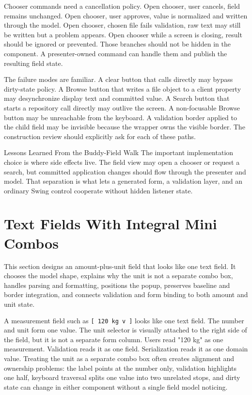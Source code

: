 Chooser commands need a cancellation policy. Open chooser, user cancels, field remains
unchanged. Open chooser, user approves, value is normalized and written through the
model. Open chooser, chosen file fails validation, raw text may still be written but a
problem appears. Open chooser while a screen is closing, result should be ignored or
prevented. Those branches should not be hidden in the component. A presenter-owned
command can handle them and publish the resulting field state.

The failure modes are familiar. A clear button that calls
directly may bypass dirty-state policy. A Browse button that writes a file object to a
client property may desynchronize display text and committed value. A Search button that
starts a repository call directly may outlive the screen. A non-focusable Browse button
may be unreachable from the keyboard. A validation border applied to the child field may
be invisible because the wrapper owns the visible border. The construction review should
explicitly ask for each of these paths.

\begin{principlebox}{Lessons Learned From the Buddy-Field Walk}
The important implementation choice is where side effects live. The field view
may open a chooser or request a search, but committed application changes should
flow through the presenter and model. That separation is what lets a generated
form, a validation layer, and an ordinary Swing control cooperate without hidden
listener state.
\end{principlebox}

\section{Text Fields With Integral Mini Combos}

\begin{roadmapbox}
This section designs an amount-plus-unit field that looks like one text field.
It chooses the model shape, explains why the unit is not a separate combo box,
handles parsing and formatting, positions the popup, preserves baseline and
border integration, and connects validation and form binding to both amount and
unit state.
\end{roadmapbox}

A measurement field such as \texttt{[ 120 kg v ]} looks like one text field. The number
and unit form one value. The unit selector is visually attached to the right side of the
field, but it is not a separate form column. Users read "120 kg" as one measurement.
Validation reads it as one field. Serialization reads it as one domain value. Treating
the unit as a separate combo box often creates alignment and ownership problems: the
label points at the number only, validation highlights one half, keyboard traversal
splits one value into two unrelated stops, and dirty state can change in either
component without a single field model noticing.


